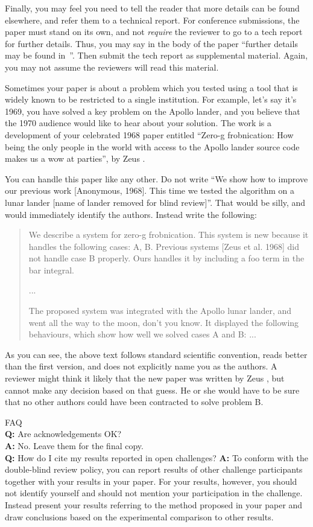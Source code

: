 Finally, you may feel you need to tell the reader that more details can be found elsewhere, and refer them to a technical report.
For conference submissions, the paper must stand on its own, and not {\em require} the reviewer to go to a tech report for further details.
Thus, you may say in the body of the paper ``further details may be found in~\cite{Authors14b}''.
Then submit the tech report as supplemental material.
Again, you may not assume the reviewers will read this material.

Sometimes your paper is about a problem which you tested using a tool that is widely known to be restricted to a single institution.
For example, let's say it's 1969, you have solved a key problem on the Apollo lander, and you believe that the 1970 audience would like to hear about your
solution.
The work is a development of your celebrated 1968 paper entitled ``Zero-g frobnication: How being the only people in the world with access to the Apollo lander source code makes us a wow at parties'', by Zeus \etal.

You can handle this paper like any other.
Do not write ``We show how to improve our previous work [Anonymous, 1968].
This time we tested the algorithm on a lunar lander [name of lander removed for blind review]''.
That would be silly, and would immediately identify the authors.
Instead write the following:
\begin{quotation}
\noindent
   We describe a system for zero-g frobnication.
   This system is new because it handles the following cases:
   A, B.  Previous systems [Zeus et al. 1968] did not  handle case B properly.
   Ours handles it by including a foo term in the bar integral.

   ...

   The proposed system was integrated with the Apollo lunar lander, and went all the way to the moon, don't you know.
   It displayed the following behaviours, which show how well we solved cases A and B: ...
\end{quotation}
As you can see, the above text follows standard scientific convention, reads better than the first version, and does not explicitly name you as the authors.
A reviewer might think it likely that the new paper was written by Zeus \etal, but cannot make any decision based on that guess.
He or she would have to be sure that no other authors could have been contracted to solve problem B.
\medskip

\noindent
FAQ\medskip\\
{\bf Q:} Are acknowledgements OK?\\
{\bf A:} No.  Leave them for the final copy.\medskip\\
{\bf Q:} How do I cite my results reported in open challenges?
{\bf A:} To conform with the double-blind review policy, you can report results of other challenge participants together with your results in your paper.
For your results, however, you should not identify yourself and should not mention your participation in the challenge.
Instead present your results referring to the method proposed in your paper and draw conclusions based on the experimental comparison to other results.\medskip\\

